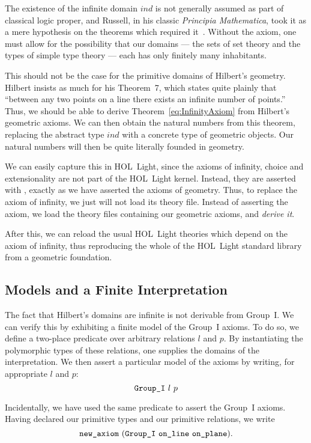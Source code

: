 The existence of the infinite domain $ind$ is not generally assumed as part of classical logic proper, and Russell, in his classic \emph{Principia Mathematica}, took it as a mere hypothesis on the theorems which required it~\cite{LogicismRevisited}. Without the axiom, one must allow for the possibility that our domains --- the sets of set theory and the types of simple type theory --- each has only finitely many inhabitants.

This should not be the case for the primitive domains of Hilbert's geometry. Hilbert insists as much for his Theorem~7, which states quite plainly that ``between any two points on a line there exists an infinite number of points.'' Thus, we should be able to derive Theorem~\ref{eq:InfinityAxiom} from Hilbert's geometric axioms. We can then obtain the natural numbers from this theorem, replacing the abstract type $ind$ with a concrete type of geometric objects. Our natural numbers will then be quite literally founded in geometry.

We can easily capture this in HOL~Light, since the axioms of infinity, choice and extensionality are not part of the HOL~Light kernel. Instead, they are asserted with , exactly as we have asserted the axioms of geometry. Thus, to replace the axiom of infinity, we just will not load its theory file. Instead of asserting the axiom, we load the theory files containing our geometric axioms, and \emph{derive it}. 

After this, we can reload the usual HOL~Light theories which depend on the axiom of infinity, thus reproducing the whole of the HOL~Light standard library from a geometric foundation.

\subsection{Models and a Finite Interpretation}\label{sec:FiniteModel}
The fact that Hilbert's domains are infinite is not derivable from Group~I. We can verify this by exhibiting a finite model of the Group~I axioms. To do so, we define a two-place predicate  over arbitrary relations $l$ and $p$. By instantiating the polymorphic types of these relations, one supplies the domains of the interpretation. We then assert a particular model of the axioms by writing, for appropriate $l$ and $p$:
\begin{displaymath}
\texttt{Group\_I}\ l\ p
\end{displaymath}

Incidentally, we have used the same predicate to assert the Group~I axioms. Having declared our primitive types and our primitive relations, we write
\begin{displaymath}
  \code{new\_axiom}\ (\code{Group\_I}\ \code{on\_line}\ \code{on\_plane}).
\end{displaymath}

